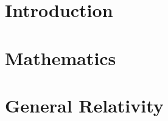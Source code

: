 \documentclass[ twoside,openright,titlepage,numbers=noenddot,headinclude,%
                footinclude=true,cleardoublepage=empty,abstractoff, %
                BCOR=5mm,paper=a4,fontsize=11pt,%
                ngerman,american,%
                ]{scrreprt}
\begin{document}
    \frenchspacing
    \raggedbottom
    \pagestyle{plain}

    
    
    \cleardoublepage
    \cleardoublepage
    \cleardoublepage
    \pagestyle{scrheadings}
    \cleardoublepage

    \cleardoublepage{}
    \cleardoublepage


	\listoftodos[To do list]
	
	\ctparttext{}
	\part{Introduction}
	
    \ctparttext{}
    \part{Mathematics}
    
    
    
    
    
    \ctparttext{}
    \part{General Relativity}
    
    
    
    
\end{document}
